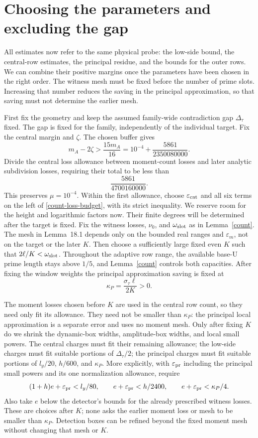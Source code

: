 \documentclass[10pt,reqno,a4paper]{amsart}
\theoremstyle{remark}
\newcommand{\eps}{\varepsilon}
\newcommand{\st}{\sigma_\tau}
\begin{document}
\section{Choosing the parameters and excluding the gap}\label{sec-assembly}

All estimates now refer to the same physical probe: the low-side bound,
the central-row estimates, the principal residue, and the bounds for the
outer rows. We can combine their positive margins once the parameters
have been chosen in the right order. The witness mesh must be fixed
before the number of prime slots. Increasing that number reduces the
saving in the principal approximation, so that saving must not determine
the earlier mesh.

First fix the geometry and keep the assumed family-wide contradiction
gap $\Delta_\tau$ fixed. The gap is fixed for the family, independently of the individual
target. Fix the central margin and $\zeta$. The chosen buffer gives
\[
 m_A-2\zeta>\frac{15m_A}{16}
        =10^{-4}+\frac{5861}{2350080000}.
\]
Divide the central loss allowance between moment-count losses
and later analytic subdivision losses, requiring their total to
be less than
\[
                              \frac{5861}{4700160000}.
\]
This preserves $\mu=10^{-4}$. Within the first allowance, choose
$\eps_{\rm cnt}$ and all six terms on the left of
\eqref{count-loss-budget}, with its strict inequality. We reserve room for the height and logarithmic factors now. Their
finite degrees will be determined after the target is fixed. Fix the witness losses,
$\nu_0$, and $\omega_{\rm slot}$ as in Lemma~\ref{count}.
The mesh in Lemma~18.1 depends only on the bounded real ranges and
$\eps_m$, not on the target or the later $K$. Then choose a sufficiently
large fixed even $K$ such that $2\ell/K<\omega_{\rm slot}$.
Throughout the adaptive row range, the available base-U prime length
stays above $1/5$, and
Lemma~\ref{count} controls both capacities. After fixing the
window weights the principal approximation saving is fixed at
\[
                               \kappa_P=\frac{\st\ell}{2K}>0.
\]

The moment losses chosen before $K$ are used in the central row count,
so they need only fit its allowance. They need not be smaller than
$\kappa_P$: the principal local approximation is a separate error and
uses no moment mesh.
Only after fixing $K$ do we shrink the dynamic-box widths,
amplitude-box widths, and local small powers. The central charges
must fit their remaining allowance; the low-side charges must
fit suitable portions of $\Delta_\tau/2$; the principal charges
must fit suitable portions of $l_y/20$, $h/600$, and $\kappa_P$.
More explicitly, with $\eps_{\rm pr}$ including the principal
small powers and its one normalization allowance, require
\[
 (1+h)e+\eps_{\rm pr}<l_y/80,\qquad
 e+\eps_{\rm pr}<h/2400,\qquad
 e+\eps_{\rm pr}<\kappa_P/4.
\]
Also take $e$ below the detector's bounds for the already prescribed
witness losses. These are choices after $K$; none asks the earlier
moment loss or mesh to be smaller than $\kappa_P$.
Detection boxes can be refined beyond the fixed moment mesh
without changing that mesh or $K$.
\end{document}
